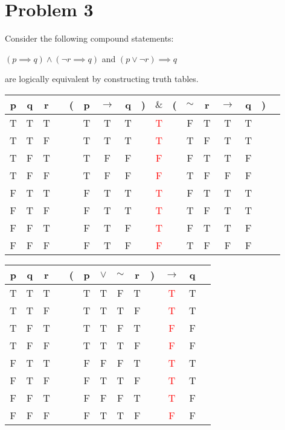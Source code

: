 \documentclass{article}
\newenvironment{problem}[1]{
  \nobreak\section*{Problem #1}
}{}
\begin{document}
  \begin{problem}{3}
    Consider the following compound statements:
    \begin{center}
      $(p \implies q) \wedge (\neg r \implies q)$ and $(p \vee \neg r) \implies q$
    \end{center}
    are logically equivalent by constructing truth tables.
    \begin{center}
    \begin{tabular}{@{ }c@{ }@{ }c@{ }@{ }c | c@{ }@{}c@{}@{ }c@{ }@{ }c@{ }@{ }c@{ }@{}c@{}@{ }c@{ }@{}c@{}@{ }c@{ }@{ }c@{ }@{ }c@{ }@{ }c@{ }@{}c@{}@{ }c}
      p & q & r &  & ( & p & $\rightarrow$ & q & ) & $\&$ & ( & $\sim$ & r & $\rightarrow$ & q & ) & \\
      \hline 
      T & T & T &  &  & T & T & T &  & \textcolor{red}{T} &  & F & T & T & T &  & \\
      T & T & F &  &  & T & T & T &  & \textcolor{red}{T} &  & T & F & T & T &  & \\
      T & F & T &  &  & T & F & F &  & \textcolor{red}{F} &  & F & T & T & F &  & \\
      T & F & F &  &  & T & F & F &  & \textcolor{red}{F} &  & T & F & F & F &  & \\
      F & T & T &  &  & F & T & T &  & \textcolor{red}{T} &  & F & T & T & T &  & \\
      F & T & F &  &  & F & T & T &  & \textcolor{red}{T} &  & T & F & T & T &  & \\
      F & F & T &  &  & F & T & F &  & \textcolor{red}{T} &  & F & T & T & F &  & \\
      F & F & F &  &  & F & T & F &  & \textcolor{red}{F} &  & T & F & F & F &  & \\
    \end{tabular}
    \end{center}
    \begin{center}
      \begin{tabular}{@{ }c@{ }@{ }c@{ }@{ }c | c@{ }@{}c@{}@{ }c@{ }@{ }c@{ }@{ }c@{ }@{ }c@{ }@{}c@{}@{ }c@{ }@{ }c@{ }@{ }c}
        p & q & r &  & ( & p & $\lor$ & $\sim$ & r & ) & $\rightarrow$ & q & \\
        \hline 
        T & T & T &  &  & T & T & F & T &  & \textcolor{red}{T} & T & \\
        T & T & F &  &  & T & T & T & F &  & \textcolor{red}{T} & T & \\
        T & F & T &  &  & T & T & F & T &  & \textcolor{red}{F} & F & \\
        T & F & F &  &  & T & T & T & F &  & \textcolor{red}{F} & F & \\
        F & T & T &  &  & F & F & F & T &  & \textcolor{red}{T} & T & \\
        F & T & F &  &  & F & T & T & F &  & \textcolor{red}{T} & T & \\
        F & F & T &  &  & F & F & F & T &  & \textcolor{red}{T} & F & \\
        F & F & F &  &  & F & T & T & F &  & \textcolor{red}{F} & F & \\
        \end{tabular}
    \end{center}
  \end{problem}
\end{document}
